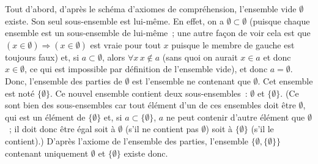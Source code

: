 \blank[medium]

\noindent{} Tout d'abord, d'après le schéma d'axiomes de compréhension, l'ensemble vide $\emptyset$ existe. 
Son seul sous-ensemble est lui-même. 
En effet, on a $\emptyset \subset \emptyset$ (puisque chaque ensemble est un sous-ensemble de lui-même ; une autre façon de voir cela est que $(x \in \emptyset) \Rightarrow (x \in \emptyset)$ est vraie pour tout $x$ puisque le membre de gauche est toujours faux) et, si $a \subset \emptyset$, alors $\forall x \, x \notin a$ (sans quoi on aurait $x \in a$ et donc $x \in \emptyset$, ce qui est impossible par définition de l'ensemble vide), et donc $a = \emptyset$. 
Donc, l'ensemble des parties de $\emptyset$ est l'ensemble ne contenant que $\emptyset$. 
Cet ensemble est noté $\lbrace \emptyset \rbrace$. 
Ce nouvel ensemble contient deux sous-ensembles : $\emptyset$ et $\lbrace \emptyset \rbrace$. 
(Ce sont bien des sous-ensembles car tout élément d'un de ces ensembles doit être $\emptyset$, qui est un élément de $\lbrace \emptyset \rbrace$ et, si $a \subset \lbrace \emptyset \rbrace$, $a$ ne peut contenir d'autre élément que $\emptyset$ ; il doit donc être égal soit à $\emptyset$ (s'il ne contient pas $\emptyset$) soit à $\lbrace \emptyset \rbrace$ (s'il le contient).) 
D'après l'axiome de l'ensemble des parties, l'ensemble $\lbrace \emptyset, \lbrace \emptyset \rbrace \rbrace$ contenant uniquement $\emptyset$ et $\lbrace \emptyset \rbrace$ existe donc. 

